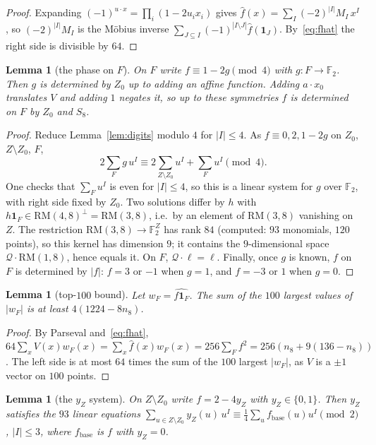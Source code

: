 \documentclass[11pt]{article}
\newtheorem{lemma}[theorem]{Lemma}
\theoremstyle{definition}
\theoremstyle{remark}
\newcommand{\F}{\mathbb{F}}
\newcommand{\ind}{\mathbf{1}}
\newcommand{\RM}{\mathrm{RM}}
\DeclareRobustCommand{\_}{\textunderscore\allowbreak}
\begin{document}
\begin{proof}
Expanding $(-1)^{u\cdot x}=\prod_i(1-2u_ix_i)$ gives $\widehat f(x)=\sum_I(-2)^{|I|}M_I\,x^I$, so $(-2)^{|I|}M_I$ is the M\"obius inverse $\sum_{J\subseteq I}(-1)^{|I\setminus J|}\widehat f(\ind_J)$. By~\eqref{eq:fhat} the right side is divisible by $64$.
\end{proof}

\begin{lemma}[the phase on $F$]\label{lem:phase}
On $F$ write $f\equiv1-2g\pmod4$ with $g:F\to\F_2$. Then $g$ is determined by $Z_0$ up to adding an affine function. Adding $a\cdot x_0$ translates $V$ and adding $1$ negates it, so up to these symmetries $f$ is determined on $F$ by $Z_0$ and $S_8$.
\end{lemma}

\begin{proof}
Reduce Lemma~\ref{lem:digits} modulo $4$ for $|I|\le4$. As $f\equiv0,2,1-2g$ on $Z_0$, $Z\setminus Z_0$, $F$,
\[
  2\sum_{F}g\,u^I\equiv 2\sum_{Z\setminus Z_0}u^I+\sum_F u^I\pmod 4 .
\]
One checks that $\sum_Fu^I$ is even for $|I|\le4$, so this is a linear system for $g$ over $\F_2$, with right side fixed by $Z_0$. Two solutions differ by $h$ with $h\ind_F\in\RM(4,8)^\perp=\RM(3,8)$, i.e.\ by an element of $\RM(3,8)$ vanishing on $Z$. The restriction $\RM(3,8)\to\F_2^{Z}$ has rank $84$ (computed: $93$ monomials, $120$ points), so this kernel has dimension $9$; it contains the $9$-dimensional space $\mathcal Q\cdot\RM(1,8)$, hence equals it. On $F$, $\mathcal Q\cdot\ell=\ell$. Finally, once $g$ is known, $f$ on $F$ is determined by $|f|$: $f=3$ or $-1$ when $g=1$, and $f=-3$ or $1$ when $g=0$.
\end{proof}

\begin{lemma}[top-$100$ bound]\label{lem:top}
Let $w_F=\widehat{f\ind_F}$. The sum of the $100$ largest values of $|w_F|$ is at least $4(1224-8n_8)$.
\end{lemma}

\begin{proof}
By Parseval and~\eqref{eq:fhat}, $64\sum_xV(x)w_F(x)=\sum_x\widehat f(x)w_F(x)=256\sum_Ff^2=256(n_8+9(136-n_8))$. The left side is at most $64$ times the sum of the $100$ largest $|w_F|$, as $V$ is a $\pm1$ vector on $100$ points.
\end{proof}

\begin{lemma}[the $y_Z$ system]\label{lem:yz}
On $Z\setminus Z_0$ write $f=2-4y_Z$ with $y_Z\in\{0,1\}$. Then $y_Z$ satisfies the $93$ linear equations $\sum_{u\in Z\setminus Z_0}y_Z(u)\,u^I\equiv \tfrac14\sum_u f_{\mathrm{base}}(u)u^I\pmod2$, $|I|\le3$, where $f_{\mathrm{base}}$ is $f$ with $y_Z=0$.
\end{lemma}
\end{document}
